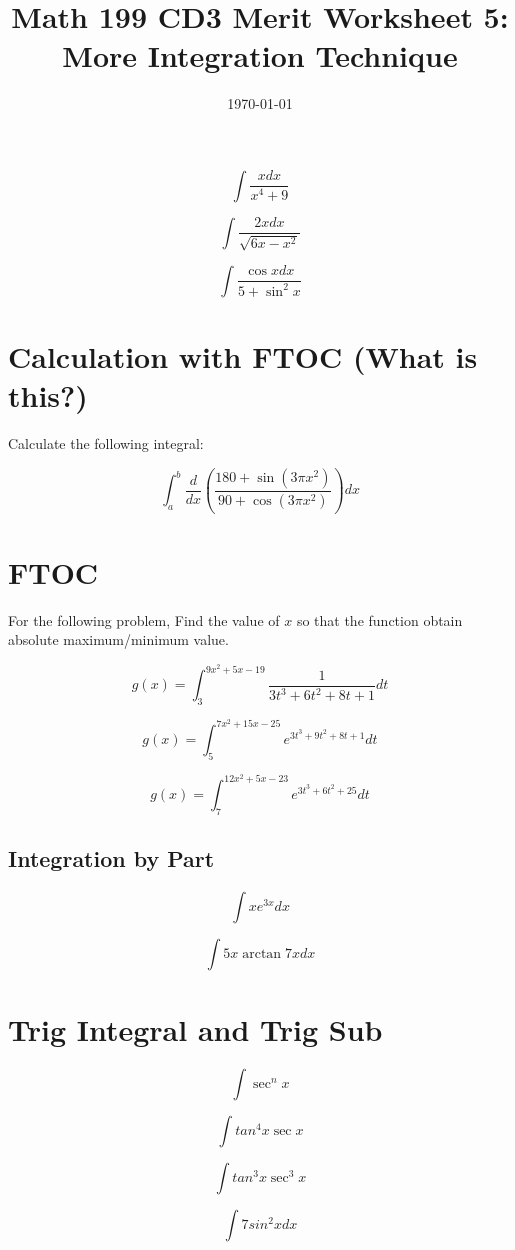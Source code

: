 
\usepackage{fullpage,amsmath,amssymb,amsthm}

\newcommand{\D}{\displaystyle}

\title{Math 199 CD3 Merit Worksheet 5: More Integration Technique}
\date{\today}




\maketitle

\be

	\item $$\int\frac{xdx}{x^4+9}$$
	\vfill
	\item $$\int\frac{2xdx}{\sqrt{6x-x^2}}$$
	\vfill
	\item $$\int\frac{\cos xdx}{5 +\sin^2x}$$
	\vfill	

	\newpage
	
	\section{Calculation with FTOC (What is this?)}
	Calculate the following integral:
	\item $$\int_a^b\frac{d}{dx}\left(\frac{180+\sin(3\pi x^2)}{90+\cos(3\pi x^2)}\right)dx$$
	\vfill
	\section{FTOC}
	For the following problem, Find the value of $x$ so that the function obtain absolute maximum/minimum value.
	\item $$g(x)=\int_3^{9x^2+5x-19}\frac{1}{3t^3+6t^2+8t+1}dt$$
	\vfill
	\item $$g(x)=\int_5^{7x^2+15x-25}e^{3t^3+9t^2+8t+1}dt$$
	\vfill
	\newpage
	\item $$g(x)=\int_7^{12x^2+5x-23}e^{3t^3+6t^2+25}dt$$
	\vfill
	\subsection{Integration by Part}
	\item $$\int xe^{3x}dx$$
	\vfill
	\item $$\int 5x\arctan{7x}dx$$
	\vfill
	\section{Trig Integral and Trig Sub}
	\be 
	\item $$\int \sec^n x$$
	\item $$\int tan^4x\sec x$$
	\vfill
	\item $$\int tan^3x\sec^3 x$$
	\vfill
	\item $$\int 7sin^2xdx$$
	\vfill

	\ee
\ee

